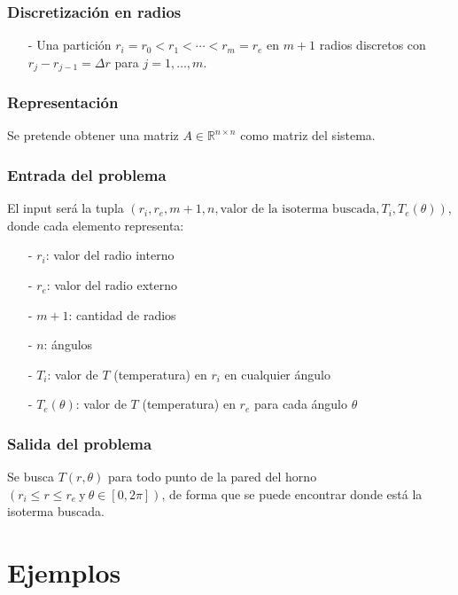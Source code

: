 \documentclass{article}
\begin{document}
\subsubsection*{Discretización en radios}
\begin{itemize}
    \item[-] Una partición $r_i = r_0 < r_{1} < \cdots < r_{m} = r_e$ en $m+1$ radios discretos con
            $r_{j} - r_{j-1} = \Delta r$ para $j=1,\ldots,m$.
\end{itemize}

\subsubsection*{Representación}
Se pretende obtener una matriz $A \in \mathbb{R}^{n\times n}$ como matriz del sistema.

\subsubsection*{Entrada del problema}
El input será la tupla $(r_i, r_e, m+1, n,\text{valor de la isoterma buscada},T_i,T_e(\theta))$, donde cada elemento representa:
\begin{itemize}
    \item[-] $r_i$: valor del radio interno 
    \item[-] $r_e$: valor del radio externo
    \item[-] $m+1$: cantidad de radios
    \item[-] $n$: ángulos
    \item[-] $T_i$: valor de $T$ (temperatura) en $r_i$ en cualquier ángulo
    \item[-] $T_e(\theta)$: valor de $T$ (temperatura) en $r_e$ para cada ángulo $\theta$
\end{itemize}

\subsubsection*{Salida del problema}
\indent \indent Se busca $T(r,\theta)$ para todo punto de la pared del horno 
$(r_i \leq r \leq r_e~\text{y}~ \theta\in[0,2\pi])$, 
de forma que se puede encontrar donde está la isoterma buscada.


\newpage


\section*{Ejemplos}
\end{document}
